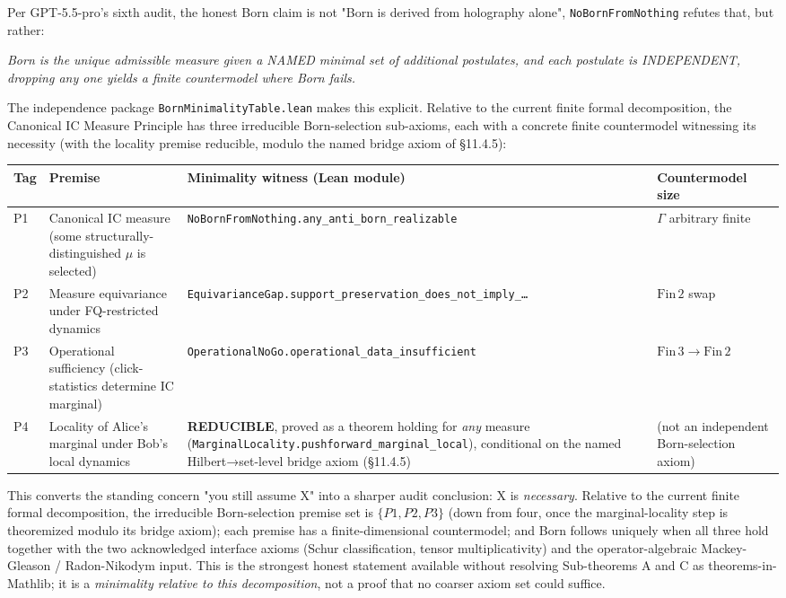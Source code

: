 \documentclass[11pt,a4paper]{article}
\newenvironment{qiqtquote}{\begin{mdframed}[style=quotestyle]}{\end{mdframed}}
\begin{document}
Per GPT-5.5-pro's sixth audit, the honest Born claim is not "Born is derived from holography alone", \texttt{NoBornFromNothing} refutes that, but rather:

\begin{qiqtquote}
\emph{Born is the unique admissible measure given a NAMED minimal set of additional postulates, and each postulate is INDEPENDENT, dropping any one yields a finite countermodel where Born fails.}
\end{qiqtquote}

The independence package \texttt{BornMinimalityTable.lean} makes this explicit. Relative to the current finite formal decomposition, the Canonical IC Measure Principle has three irreducible Born-selection sub-axioms, each with a concrete finite countermodel witnessing its necessity (with the locality premise reducible, modulo the named bridge axiom of §11.4.5):

\begin{center}
\small
\begin{tabularx}{\linewidth}{|Y|Y|Y|Y|}
\hline
\textbf{Tag} & \textbf{Premise} & \textbf{Minimality witness (Lean module)} & \textbf{Countermodel size} \\
\hline
P1 & Canonical IC measure (some structurally-distinguished $\mu$ is selected) & \texttt{NoBornFromNothing.any\_anti\_born\_realizable} & $\Gamma$ arbitrary finite \\
\hline
P2 & Measure equivariance under FQ-restricted dynamics & \texttt{EquivarianceGap.support\_preservation\_does\_not\_imply\_…} & $\mathrm{Fin}\,2$ swap \\
\hline
P3 & Operational sufficiency (click-statistics determine IC marginal) & \texttt{OperationalNoGo.operational\_data\_insufficient} & $\mathrm{Fin}\,3 \to \mathrm{Fin}\,2$ \\
\hline
P4 & Locality of Alice's marginal under Bob's local dynamics & \textbf{REDUCIBLE}, proved as a theorem holding for \emph{any} measure (\texttt{MarginalLocality.pushforward\_marginal\_local}), conditional on the named Hilbert→set-level bridge axiom (§11.4.5) & (not an independent Born-selection axiom) \\
\hline
\end{tabularx}
\end{center}

This converts the standing concern "you still assume X" into a sharper audit conclusion: X is \emph{necessary}. Relative to the current finite formal decomposition, the irreducible Born-selection premise set is $\{P1, P2, P3\}$ (down from four, once the marginal-locality step is theoremized modulo its bridge axiom); each premise has a finite-dimensional countermodel; and Born follows uniquely when all three hold together with the two acknowledged interface axioms (Schur classification, tensor multiplicativity) and the operator-algebraic Mackey-Gleason / Radon-Nikodym input. This is the strongest honest statement available without resolving Sub-theorems A and C as theorems-in-Mathlib; it is a \emph{minimality relative to this decomposition}, not a proof that no coarser axiom set could suffice.
\end{document}
